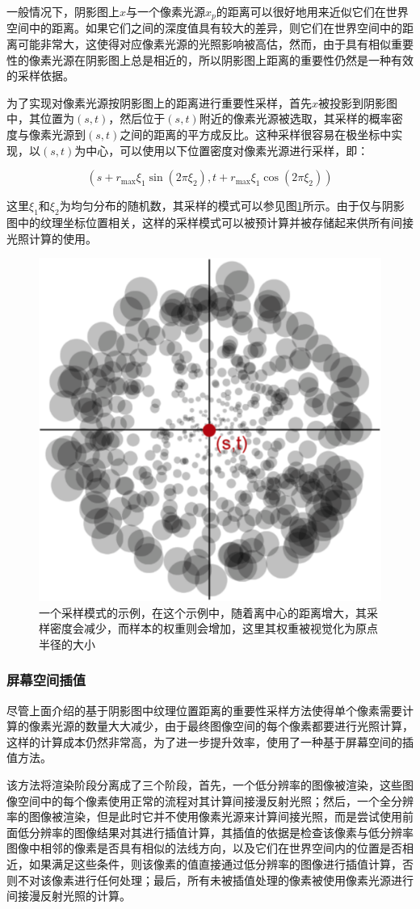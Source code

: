 一般情况下，阴影图上$x$与一个像素光源$x_p$的距离可以很好地用来近似它们在世界空间中的距离。如果它们之间的深度值具有较大的差异，则它们在世界空间中的距离可能非常大，这使得对应像素光源的光照影响被高估，然而，由于具有相似重要性的像素光源在阴影图上总是相近的，所以阴影图上距离的重要性仍然是一种有效的采样依据。

为了实现对像素光源按阴影图上的距离进行重要性采样，首先$x$被投影到阴影图中，其位置为$(s,t)$，然后位于$(s,t)$附近的像素光源被选取，其采样的概率密度与像素光源到$(s,t)$之间的距离的平方成反比。这种采样很容易在极坐标中实现，以$(s,t)$为中心，可以使用以下位置密度对像素光源进行采样，即：

\begin{equation}
	(s+r_{\max}\xi_1 \sin(2\pi \xi_2),t+r_{\max}\xi_1\cos(2\pi\xi_2))
\end{equation}

\noindent 这里$\xi_1$和$\xi_2$为均匀分布的随机数，其采样的模式可以参见图\ref{f:ir-rsm-sampling-pattern}所示。由于仅与阴影图中的纹理坐标位置相关，这样的采样模式可以被预计算并被存储起来供所有间接光照计算的使用。

\begin{figure}
\sidecaption
	\includegraphics[width=.35\textwidth]{figures/ir/ir-2-3}
	\caption{一个采样模式的示例，在这个示例中，随着离中心的距离增大，其采样密度会减少，而样本的权重则会增加，这里其权重被视觉化为原点半径的大小}
	\label{f:ir-rsm-sampling-pattern}
\end{figure} 




\subsubsection{屏幕空间插值}
尽管上面介绍的基于阴影图中纹理位置距离的重要性采样方法使得单个像素需要计算的像素光源的数量大大减少，由于最终图像空间的每个像素都要进行光照计算，这样的计算成本仍然非常高，为了进一步提升效率，\cite{a:ReflectiveShadowMaps}使用了一种基于屏幕空间的插值方法。

该方法将渲染阶段分离成了三个阶段，首先，一个低分辨率的图像被渲染，这些图像空间中的每个像素使用正常的流程对其计算间接漫反射光照；然后，一个全分辨率的图像被渲染，但是此时它并不使用像素光源来计算间接光照，而是尝试使用前面低分辨率的图像结果对其进行插值计算，其插值的依据是检查该像素与低分辨率图像中相邻的像素是否具有相似的法线方向，以及它们在世界空间内的位置是否相近，如果满足这些条件，则该像素的值直接通过低分辨率的图像进行插值计算，否则不对该像素进行任何处理；最后，所有未被插值处理的像素被使用像素光源进行间接漫反射光照的计算。

